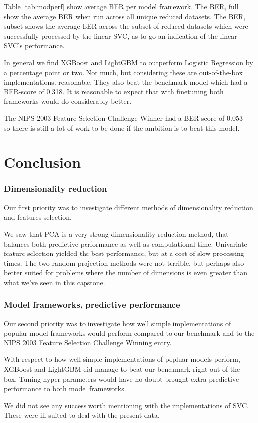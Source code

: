 \documentclass[12pt]{article}
\begin{document}
Table \ref{tab:modperf} show average BER per model framework. The BER, full show the average BER when run across all unique reduced datasets. The BER, subset shows the average BER across the subset of reduced datasets which were successfully processed by the linear SVC, as to go an indication of the linear SVC's performance.

In general we find XGBoost and LightGBM to outperform Logistic Regression by a percentage point or two. Not much, but considering these are out-of-the-box implementations, reasonable. They also beat the benchmark model which had a BER-score of 0.318. It is reasonable to expect that with finetuning both frameworks would do considerably better.

The NIPS 2003 Feature Selection Challenge Winner had a BER score of 0.053 - so there is still a lot of work to be done if the ambition is to beat this model.

\section{Conclusion}

\subsubsection{Dimensionality reduction}

Our first priority was to investigate different methods of dimensionality reduction and features selection.

We saw that PCA is a very strong dimensionality reduction method, that balances both predictive performance as well as computational time. Univariate feature selection yielded the best performance, but at a cost of slow processing times. The two random projection methods were not terrible, but perhaps also better suited for problems where the number of dimensions is even greater than what we've seen in this capstone.

\subsubsection{Model frameworks, predictive performance}

Our second priority was to investigate how well simple implementations of popular model frameworks would perform compared to our benchmark and to the NIPS 2003 Feature Selection Challenge Winning entry.

With respect to how well simple implementations of popluar models perform, XGBoost and LightGBM did manage to beat our benchmark right out of the box. Tuning hyper parameters would have no doubt brought extra predictive performance to both model frameworks. 

We did not see any success worth mentioning with the implementations of SVC. These were ill-suited to deal with the present data.


{}
\end{document}
